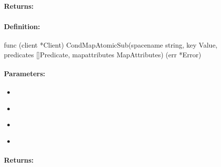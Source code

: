 \paragraph{Returns:}


\pagebreak
\subsubsection{}
\label{api:Go:CondMapAtomicSub}


\paragraph{Definition:}
\begin{gocode}
func (client *Client) CondMapAtomicSub(spacename string, key Value, predicates []Predicate, mapattributes MapAttributes) (err *Error)
\end{gocode}

\paragraph{Parameters:}
\begin{itemize}[noitemsep]
\item {}\\

\item {}\\

\item {}\\

\item {}\\

\end{itemize}

\paragraph{Returns:}


\pagebreak
\subsubsection{}
\label{api:Go:GroupMapAtomicSub}


